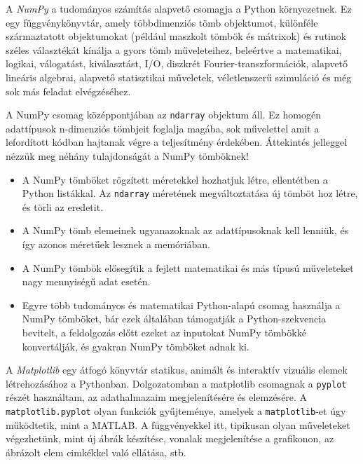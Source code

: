 A \textit{NumPy} a tudományos számítás alapvető csomagja a Python környezetnek.
Ez egy függvénykönyvtár, amely többdimenziós tömb objektumot, különféle származtatott objektumokat (például maszkolt tömbök és mátrixok) és rutinok széles választékát kínálja a gyors tömb műveleteihez, beleértve a matematikai, logikai, válogatást, kiválasztást, I/O, diszkrét Fourier-transzformációk, alapvető lineáris algebrai, alapvető statisztikai műveletek, véletlenszerű szimuláció és még sok más feladat elvégzéséhez.

A NumPy csomag középpontjában az \texttt{ndarray} objektum áll. Ez homogén adattípusok n-dimenziós tömbjeit foglalja magába, sok művelettel amit a lefordított kódban hajtanak végre a teljesítmény érdekében.
Áttekintés jelleggel nézzük meg néhány tulajdonságát a NumPy tömböknek!
\begin{itemize}
\item A NumPy tömböket rögzített méretekkel hozhatjuk létre, ellentétben a Python listákkal.
Az \texttt{ndarray} méretének megváltoztatása új tömböt hoz létre, és törli az eredetit.
\item A NumPy tömb elemeinek ugyanazoknak az adattípusoknak kell lenniük, és így azonos méretűek lesznek a memóriában.
\item A NumPy tömbök elősegítik a fejlett matematikai és más típusú műveleteket nagy mennyiségű adat esetén.
\item Egyre több tudományos és matematikai Python-alapú csomag használja a NumPy tömböket, bár ezek általában támogatják a Python-szekvencia bevitelt, a feldolgozás előtt ezeket az inputokat NumPy tömbökké konvertálják, és gyakran NumPy tömböket adnak ki.
\end{itemize}


A \textit{Matplotlib} egy átfogó könyvtár statikus, animált és interaktív vizuális elemek létrehozásához a Pythonban.
Dolgozatomban a matplotlib csomagnak a \texttt{pyplot} részét használtam, az adathalmazaim megjelenítésére és elemzésére. A \texttt{matplotlib.pyplot} olyan funkciók gyűjteménye, amelyek a \texttt{matplotlib}-et úgy működtetik, mint a MATLAB. A függvényekkel itt, tipikusan olyan műveleteket végezhetünk, mint új ábrák készítése, vonalak megjelenítése a grafikonon, az ábrázolt elem cimkékkel való ellátása, stb.


